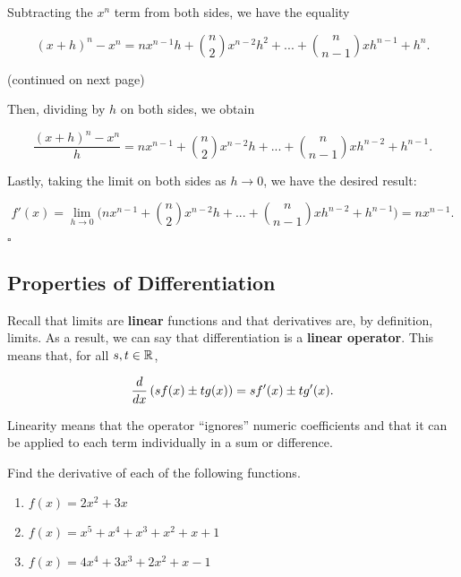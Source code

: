 \documentclass[12pt]{article}
\begin{document}
Subtracting the $x^n$ term from both sides, we have the equality

$$(x+h)^{n} - x^{n} = nx^{n-1}h + {n \choose 2}x^{n-2}h^{2} + ... + {n \choose n-1}xh^{n-1} + h^{n}.$$

(continued on next page)

\newpage
Then, dividing by $h$ on both sides, we obtain

$$\frac{(x+h)^{n} - x^{n}}{h} = nx^{n-1} + {n \choose 2}x^{n-2}h + ... + {n \choose n-1}xh^{n-2} + h^{n-1}.$$

\vspace{3mm}

Lastly, taking the limit on both sides as $h\to 0$, we have the desired result:

$$ f'(x) = \lim_{h \to 0}\bigg(nx^{n-1} + {n \choose 2}x^{n-2}h + ... + {n \choose n-1}xh^{n-2} + h^{n-1}\bigg) = nx^{n-1}. $$
\begin{flushright}
$\square$
\end{flushright}


\vspace{5mm}

\subsection*{Properties of Differentiation}

Recall that limits are \textbf{linear} functions and that derivatives are, by definition, limits. As a result, we can say that differentiation is a \textbf{linear operator}. This means that, for all $s,t\in\mathbb{R}$,

$$\frac{d}{dx}\left( s f(x) \pm t g(x)\right)= s f'(x)\pm t g'(x).$$

\vspace{3mm}

Linearity means that the operator ``ignores'' numeric coefficients and that it can be applied to each term individually in a sum or difference.

\Example Find the derivative of each of the following functions.

\begin{enumerate}
	\item[\tc{1}] $f(x)=2x^2+3x$
	
	\vspace{20mm}
	
	\item[\tc{2}] $f(x)=x^5+x^4+x^3+x^2+x+1$
	
	\vspace{20mm}
	
	\item[\tc{3}] $f(x)=4x^4+3x^3+2x^2+x-1$
	
	\vspace{20mm}
\end{enumerate}
\end{document}
